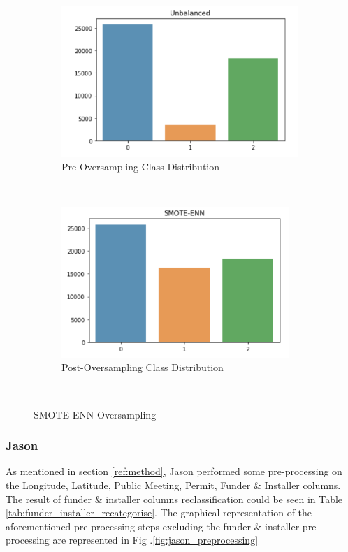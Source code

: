 \documentclass[conference]{IEEEtran}
\begin{document}
\begin{figure}[t!]
  \centering
  \begin{subfigure}[t]{0.5\textwidth}
      \centering
      \includegraphics[height=2.25in]{figures/tom_smote_1}
      \caption{Pre-Oversampling Class Distribution}
  \end{subfigure}%
  ~
  \begin{subfigure}[t]{0.5\textwidth}
      \centering
      \includegraphics[height=2.25in]{figures/tom_smote_2}
      \caption{Post-Oversampling Class Distribution}
  \end{subfigure}
  ~
  \caption{SMOTE-ENN Oversampling}
  \label{fig:smote}
\end{figure}

\subsubsection{Jason}

As mentioned in section \ref{ref:method}, Jason performed some pre-processing on the Longitude, Latitude, Public Meeting, Permit, Funder \& Installer columns. The result of funder \& installer columns reclassification could be seen in Table \ref{tab:funder_installer_recategorise}. The graphical representation of the aforementioned pre-processing steps excluding the funder \& installer pre-processing are represented in Fig .\ref{fig:jason_preprocessing}
\end{document}

